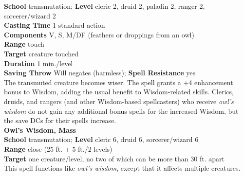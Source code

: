 \textbf{School} transmutation; \textbf{Level} cleric 2, druid 2, paladin 2, ranger 2, sorcerer/wizard 2\\
\textbf{Casting Time} 1 standard action\\
\textbf{Components} V, S, M/DF (feathers or droppings from an owl)\\
\textbf{Range} touch\\
\textbf{Target} creature touched\\
\textbf{Duration} 1 min./level\\
\textbf{Saving Throw }Will negates (harmless); \textbf{Spell Resistance} yes\\
The transmuted creature becomes wiser. The spell grants a +4 enhancement bonus to Wisdom, adding the usual benefit to Wisdom-related skills. Clerics, druids, and rangers (and other Wisdom-based spellcasters) who receive \textit{owl's wisdom }do not gain any additional bonus spells for the increased Wisdom, but the save DCs for their spells increase.\\
\textbf{Owl's Wisdom, Mass}\\
\textbf{School} transmutation; \textbf{Level} cleric 6, druid 6, sorcerer/wizard 6\\
\textbf{Range} close (25 ft. + 5 ft./2 levels)\\
\textbf{Target} one creature/level, no two of which can be more than 30 ft. apart\\
This spell functions like \textit{owl's wisdom}, except that it affects multiple creatures.\\
